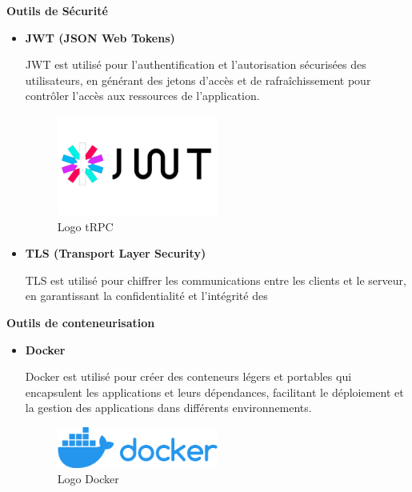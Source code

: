 \textbf{Outils de Sécurité}
\begin{itemize}
  \item \textbf{JWT (JSON Web Tokens)}

    JWT est utilisé pour l'authentification et l'autorisation sécurisées des
    utilisateurs, en générant des jetons d'accès et de rafraîchissement pour
    contrôler l'accès aux ressources de l'application.
    \begin{figure}[H]
      \centering
      \includegraphics[width=0.5\textwidth]{images/jwt-3026972785.png}
      \caption{Logo tRPC}
    \end{figure}

  \item \textbf{TLS (Transport Layer Security)}

    TLS est utilisé pour chiffrer les communications entre les clients et le
    serveur, en garantissant la confidentialité et l'intégrité des
\end{itemize}

%
%
%

\textbf{Outils de conteneurisation}
\begin{itemize}
  \item \textbf{Docker}

    Docker est utilisé pour créer des conteneurs légers et portables qui
    encapsulent les applications et leurs dépendances, facilitant le
    déploiement et la gestion des applications dans différents environnements.

    \begin{figure}[H]
      \centering
      \includegraphics[width=0.5\textwidth]{images/Docker_logo.svg.png}
      \caption{Logo Docker}
    \end{figure}
\end{itemize}


